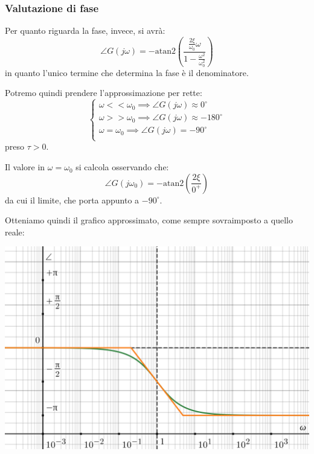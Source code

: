 \documentclass[a4paper,11pt]{article}
\begin{document}
\subsubsection{Valutazione di fase}
Per quanto riguarda la fase, invece, si avrà: 
$$
\angle G(j \omega) = -\mathrm{atan2} \left( \frac{ \frac{2\xi}{\omega_0}\omega }{ 1 - \frac{\omega^2}{\omega_0^2} } \right) 
$$
in quanto l'unico termine che determina la fase è il denominatore.

Potremo quindi prendere l'approssimazione per rette:
\[
	\begin{cases}
		\omega << \omega_0 \implies \angle G(j\omega) \approx 0^\circ \\ 	
		\omega >> \omega_0 \implies \angle G(j\omega) \approx -180^\circ \\ 	
		\omega = \omega_0 \implies \angle G(j\omega) = -90^\circ \\ 	
	\end{cases}
\]
preso $\tau > 0$.

Il valore in $\omega = \omega_0$ si calcola osservando che:
$$
\angle G(j \omega_0) = -\mathrm{atan2} \left( \frac{ 2 \xi }{ 0^+ } \right)
$$
da cui il limite, che porta appunto a $-90^\circ$.

\par\bigskip

\noindent
\begin{minipage}{\textwidth}
Otteniamo quindi il grafico approssimato, come sempre sovraimposto a quello reale:

\begin{center}
	\includegraphics[scale=0.3]{../figures/order2_bode/phase.png}
\end{center}
\end{minipage}
\end{document}
